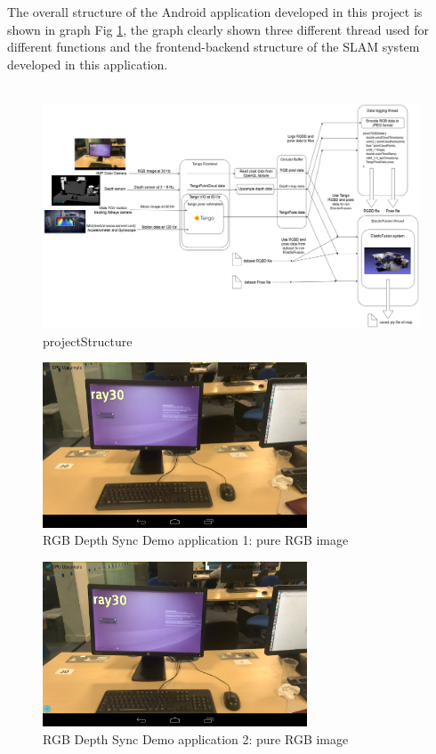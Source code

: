 \documentclass[12pt,twoside]{article}
\begin{document}
The overall structure of the Android application developed in this project is shown in graph Fig \ref{fig: projectStructure}, the graph clearly shown three different thread used for different functions and the frontend-backend structure of the SLAM system developed in this application.\\
\\
\begin{figure}[h]
    \centering
    \includegraphics[width=1.0\textwidth]{figures/projectStructure}
    \caption{projectStructure}
    \label{fig: projectStructure}
\end{figure}

\begin{figure}[h]
    \centering
    \includegraphics[width=0.7\textwidth]{figures/rgbd1}
    \caption{RGB Depth Sync Demo application 1: pure RGB image}
    \label{fig: rgbd1}
\end{figure}

\begin{figure}[h]
    \centering
    \includegraphics[width=0.7\textwidth]{figures/rgbd2}
    \caption{RGB Depth Sync Demo application 2: pure RGB image}
    \label{fig: rgbd2}
\end{figure}
\end{document}
